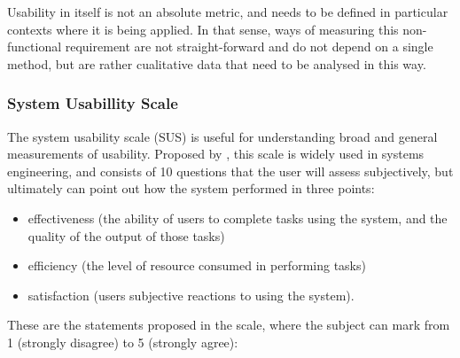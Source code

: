 Usability in itself is not an absolute metric, and needs to be defined in particular contexts where it is being applied. In that sense, ways of measuring this non-functional requirement are not straight-forward and do not depend on a single method, but are rather cualitative data that need to be analysed in this way.

\subsubsection{System Usabillity Scale}

The system usability scale (SUS) is useful for understanding broad and general measurements of usability. Proposed by \cite{art:sus-1996}, this scale is widely used in systems engineering, and consists of 10 questions that the user will assess subjectively, but ultimately can point out how the system performed in three points:

\begin{itemize}
    \item effectiveness (the ability of users to complete tasks using the system, and the quality of the output of those tasks)
    \item efficiency (the level of resource consumed in performing tasks)
    \item satisfaction (users subjective reactions to using the system). \citep{art:sus-1996}
\end{itemize}

These are the statements proposed in the scale, where the subject can mark from 1 (strongly disagree) to 5 (strongly agree):

